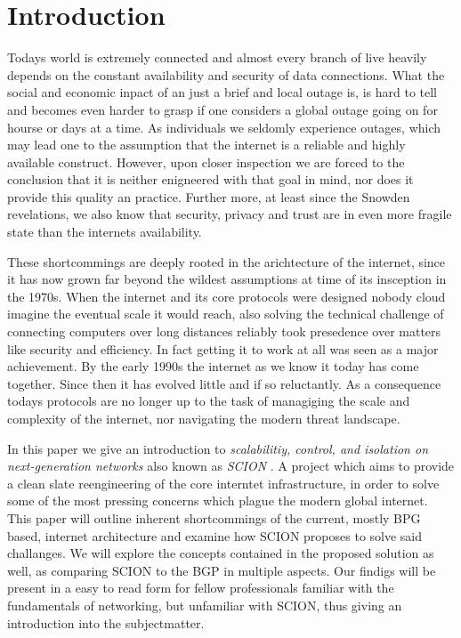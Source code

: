 \documentclass[../eva1_scion.tex]{subfiles}
\begin{document}
\chapter{Introduction}\label{ch:introduction}
\setcounter{page}{1}

Todays world is extremely connected and almost every branch of live heavily depends on the constant availability and security of data connections. What the social and economic inpact of an just a brief and local outage is, is hard to tell and becomes even harder to grasp if one considers a global outage going on for hourse or days at a time. As individuals we seldomly experience outages, which may lead one to the assumption that the internet is a reliable and highly available construct. However, upon closer inspection we are forced to the conclusion that it is neither enigneered with that goal in mind, nor does it provide this quality an practice. Further more, at least since the Snowden revelations, we also know that security, privacy and trust are in even more fragile state than the internets availability.

These shortcommings are deeply rooted in the arichtecture of the internet, since it has now grown far beyond the wildest assumptions at time of its insception in the 1970s. When the internet and its core protocols were designed nobody cloud imagine the eventual scale it would reach, also solving the technical challenge of connecting computers over long distances reliably took presedence over matters like security and efficiency. In fact getting it to work at all was seen as a major achievement. By the early 1990s the internet as we know it today has come together. Since then it has evolved little and if so reluctantly. As a consequence todays protocols are no longer up to the task of managiging the scale and complexity of the internet, nor navigating the modern threat landscape.

In this paper we give an introduction to \textit{scalabilitiy, control, and isolation on next-generation networks} also known as \textit{ SCION }. A project which aims to provide a clean slate reengineering of the core interntet infrastructure, in order to solve some of the most pressing concerns which plague the modern global internet. This paper will outline inherent shortcommings of the current, mostly BPG based, internet architecture and examine how SCION proposes to solve said challanges. We will explore the concepts contained in the proposed solution as well, as comparing SCION to the BGP in multiple aspects. Our findigs will be present in a easy to read form for fellow professionals familiar with the fundamentals of networking, but unfamiliar with SCION, thus giving an introduction into the subjectmatter.
\end{document}
